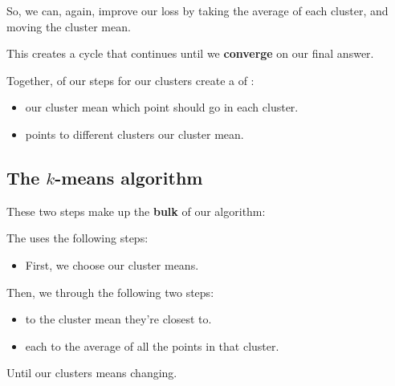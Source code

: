         So, we can, again, improve our loss by taking the average of each cluster, and moving the cluster mean.
        
        This creates a cycle that continues until we \textbf{converge} on our final answer.\\
        
        \begin{concept}
            Together, of our steps for  our clusters create a  of :
            
            \begin{itemize}
                \item {} our cluster mean  which point should go in each cluster.
                
                \item {} points to different clusters  our cluster mean.
            \end{itemize}
        \end{concept}
        
    \subsection*{The $k$-means algorithm}
    
        These two steps make up the \textbf{bulk} of our algorithm:\\
        
        \begin{definition}
            The  uses the following steps:
            
            \begin{itemize}
                \item First, we  choose our  cluster means.
            \end{itemize} 
            
            Then, we  through the following two steps:
            
            \begin{itemize}
                \item {}  to the cluster mean they're closest to.
                
                \item {} each  to the average of all the points in that cluster.
            \end{itemize}
            
            Until our clusters means  changing.
        \end{definition}
        
